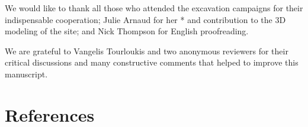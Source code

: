 \documentclass[review,authoryear]{elsarticle} %
\begin{document}
We would like to thank all those who attended the excavation campaigns for their indispensable cooperation; Julie Arnaud for her * and contribution to the 3D modeling of the site; and Nick Thompson for English proofreading.

We are grateful to Vangelis Tourloukis and two anonymous reviewers for their critical discussions and many constructive comments that helped to improve this manuscript.

\section*{References}



\end{document}
